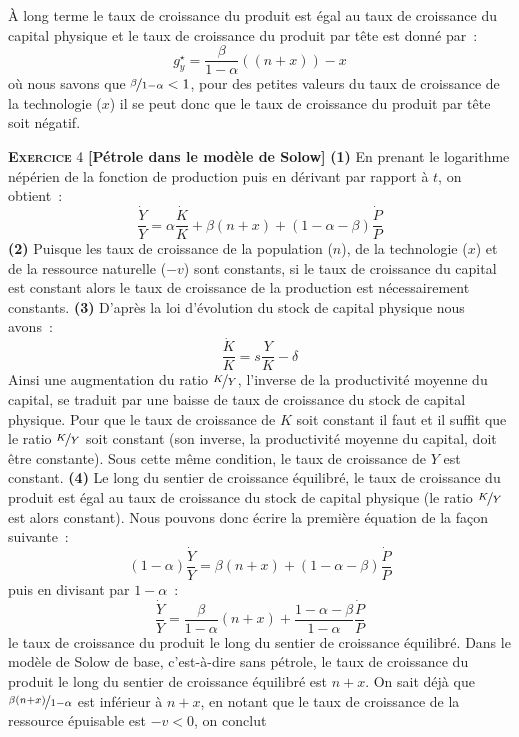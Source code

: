 \documentclass[10pt,a4paper,notitlepage,onecolumn]{article}
\newcommand{\exercice}[2]{\textsc{\textbf{Exercice}} #1 \textbf{[#2]}}
\newcommand{\question}[1]{\textbf{(#1)}}
\newcommand{\growth}[1]{\frac{\dot{#1}}{#1}}
\begin{document}
À long  terme le  taux de croissance  du produit est  égal au  taux de
croissance du capital physique et le taux de croissance du produit par
tête est donné par :
\[
g_y^{\star} = \frac{\beta}{1-\alpha}((n+x)) - x
\]
où nous  savons que  $\nicefrac{\beta}{1-\alpha}<1$, pour  des petites
valeurs du taux de croissance de  la technologie ($x$) il se peut donc
que  le  taux  de  croissance   du  produit  par  tête  soit  négatif.\newline

\bigskip

\exercice{4}{Pétrole dans le modèle  de Solow} \question{1} En prenant
le logarithme népérien  de la fonction de production  puis en dérivant
par rapport à $t$, on obtient :
\[
\growth{Y} = \alpha\growth{K} + \beta (n+x) + (1-\alpha-\beta)\growth{P}
\]
\question{2} Puisque les taux de croissance de la population ($n$), de
la  technologie  ($x$)  et  de  la  ressource  naturelle  ($-v$)  sont
constants, si le  taux de croissance du capital est  constant alors le
taux   de    croissance   de   la   production    est   nécessairement
constants. \question{3} D'après la loi d'évolution du stock de capital
physique nous avons :
\[
\growth{K} = s\frac{Y}{K} - \delta
\]
Ainsi  une augmentation  du ratio  $\nicefrac{K}{Y}$, l'inverse  de la
productivité moyenne du capital, se traduit  par une baisse de taux de
croissance  du  stock  de  capital  physique.  Pour  que  le  taux  de
croissance de  $K$ soit  constant il  faut et il  suffit que  le ratio
$\nicefrac{K}{Y}$ soit constant (son  inverse, la productivité moyenne
du capital, doit  être constante). Sous cette même  condition, le taux
de croissance de $Y$ est constant.  \question{4} Le long du sentier de
croissance équilibré,  le taux  de croissance du  produit est  égal au
taux  de   croissance  du   stock  de   capital  physique   (le  ratio
$\nicefrac{K}{Y}$  est alors  constant). Nous  pouvons donc  écrire la
première équation de la façon suivante :
\[
(1-\alpha)\growth{Y} = \beta (n+x) + (1-\alpha-\beta)\growth{P}
\]
puis en divisant par $1-\alpha$ :
\[
\growth{Y} = \frac{\beta}{1-\alpha} (n+x) + \frac{1-\alpha-\beta}{1-\alpha}\growth{P}
\]
le taux  de croissance  du produit  le long  du sentier  de croissance
équilibré. Dans le modèle de Solow de base, c'est-à-dire sans pétrole,
le taux  de croissance  du produit  le long  du sentier  de croissance
équilibré      est       $n+x$.       On      sait       déjà      que
$\nicefrac{\beta(n+x)}{1-\alpha}$ est inférieur à $n+x$, en notant que
le taux de croissance de la ressource épuisable est $-v<0$, on conclut
\end{document}
